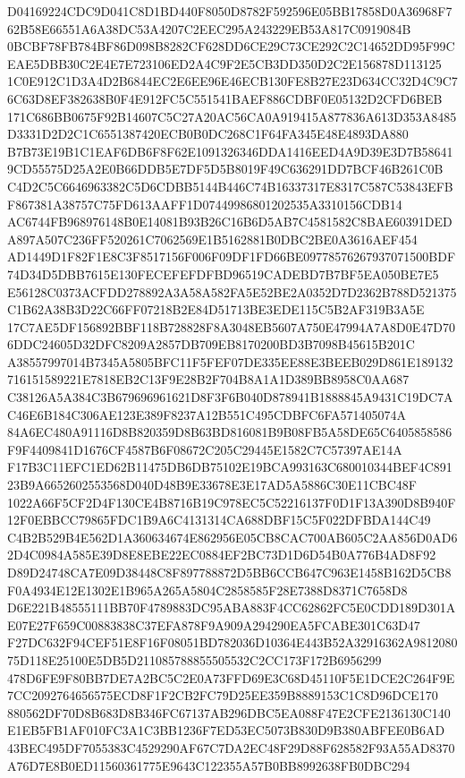 \documentclass[UTF8,fontset=fandol,zihao=-4,a4paper]{ctexart}
\begin{document}
{{D04169224CDC9D041C8D1BD440F8050D8782F592596E05BB17858D0A36968F762B58E66551A6A38DC53A4207C2EEC295A243229EB53A817C0919084B
0BCBF78FB784BF86D098B8282CF628DD6CE29C73CE292C2C14652DD95F99CEAE5DBB30C2E4E7E723106ED2A4C9F2E5CB3DD350D2C2E156878D113125
1C0E912C1D3A4D2B6844EC2E6EE96E46ECB130FE8B27E23D634CC32D4C9C76C63D8EF382638B0F4E912FC5C551541BAEF886CDBF0E05132D2CFD6BEB
171C686BB0675F92B14607C5C27A20AC56CA0A919415A877836A613D353A8485D3331D2D2C1C6551387420ECB0B0DC268C1F64FA345E48E4893DA880
B7B73E19B1C1EAF6DB6F8F62E1091326346DDA1416EED4A9D39E3D7B586419CD55575D25A2E0B66DDB5E7DF5D5B8019F49C636291DD7BCF46B261C0B
C4D2C5C6646963382C5D6CDBB5144B446C74B16337317E8317C587C53843EFBF867381A38757C75FD613AAFF1D07449986801202535A3310156CDB14
AC6744FB968976148B0E14081B93B26C16B6D5AB7C4581582C8BAE60391DEDA897A507C236FF520261C7062569E1B5162881B0DBC2BE0A3616AEF454
AD1449D1F82F1E8C3F8517156F006F09DF1FD66BE09778576267937071500BDF74D34D5DBB7615E130FECEFEFDFBD96519CADEBD7B7BF5EA050BE7E5
E56128C0373ACFDD278892A3A58A582FA5E52BE2A0352D7D2362B788D521375C1B62A38B3D22C66FF07218B2E84D51713BE3EDE115C5B2AF319B3A5E
17C7AE5DF156892BBF118B728828F8A3048EB5607A750E47994A7A8D0E47D706DDC24605D32DFC8209A2857DB709EB8170200BD3B7098B45615B201C
A38557997014B7345A5805BFC11F5FEF07DE335EE88E3BEEB029D861E189132716151589221E7818EB2C13F9E28B2F704B8A1A1D389BB8958C0AA687
C38126A5A384C3B679696961621D8F3F6B040D878941B1888845A9431C19DC7AC46E6B184C306AE123E389F8237A12B551C495CDBFC6FA571405074A
84A6EC480A91116D8B820359D8B63BD816081B9B08FB5A58DE65C6405858586F9F4409841D1676CF4587B6F08672C205C29445E1582C7C57397AE14A
F17B3C11EFC1ED62B11475DB6DB75102E19BCA993163C680010344BEF4C89123B9A6652602553568D040D48B9E33678E3E17AD5A5886C30E11CBC48F
1022A66F5CF2D4F130CE4B8716B19C978EC5C52216137F0D1F13A390D8B940F12F0EBBCC79865FDC1B9A6C4131314CA688DBF15C5F022DFBDA144C49
C4B2B529B4E562D1A360634674E862956E05CB8CAC700AB605C2AA856D0AD62D4C0984A585E39D8E8EBE22EC0884EF2BC73D1D6D54B0A776B4AD8F92
D89D24748CA7E09D38448C8F897788872D5BB6CCB647C963E1458B162D5CB8F0A4934E12E1302E1B965A265A5804C2858585F28E7388D8371C7658D8
D6E221B48555111BB70F4789883DC95ABA883F4CC62862FC5E0CDD189D301AE07E27F659C00883838C37EFA878F9A909A294290EA5FCABE301C63D47
F27DC632F94CEF51E8F16F08051BD782036D10364E443B52A32916362A981208075D118E25100E5DB5D211085788855505532C2CC173F172B6956299
478D6FE9F80BB7DE7A2BC5C2E0A73FFD69E3C68D45110F5E1DCE2C264F9E7CC2092764656575ECD8F1F2CB2FC79D25EE359B8889153C1C8D96DCE170
880562DF70D8B683D8B346FC67137AB296DBC5EA088F47E2CFE2136130C140E1EB5FB1AF010FC3A1C3BB1236F7ED53EC5073B830D9B380ABFEE0B6AD
43BEC495DF7055383C4529290AF67C7DA2EC48F29D88F628582F93A55AD8370A76D7E8B0ED11560361775E9643C122355A57B0BB8992638FB0DBC294
}}
\end{document}
